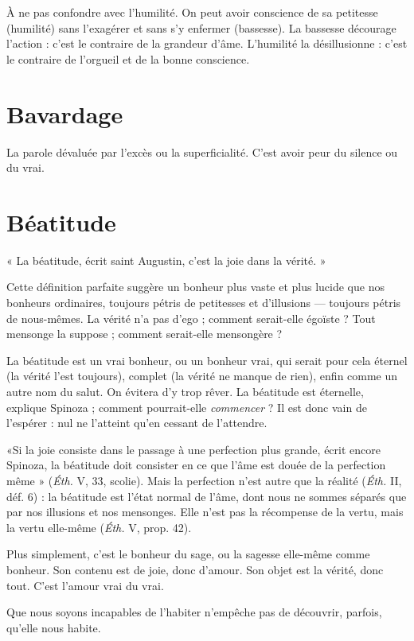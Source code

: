 À ne pas confondre avec l'humilité. On peut avoir conscience de sa petitesse
(humilité) sans l’exagérer et sans s’y enfermer (bassesse). La bassesse
décourage l’action : c’est le contraire de la grandeur d’âme. L’humilité la
désillusionne : c’est le contraire de l’orgueil et de la bonne conscience.

\section{Bavardage}
La parole dévaluée par l’excès ou la superficialité. C’est avoir
peur du silence ou du vrai.

\section{Béatitude}
« La béatitude, écrit saint Augustin, c’est la joie dans la vérité. »

Cette définition parfaite suggère un bonheur plus vaste et
plus lucide que nos bonheurs ordinaires, toujours pétris de petitesses et d’illusions —
toujours pétris de nous-mêmes. La vérité n’a pas d’ego ; comment
serait-elle égoïste ? Tout mensonge la suppose ; comment serait-elle mensongère ?

La béatitude est un vrai bonheur, ou un bonheur vrai, qui serait pour cela
éternel (la vérité l’est toujours), complet (la vérité ne manque de rien), enfin
comme un autre nom du salut. On évitera d’y trop rêver. La béatitude est éternelle,
explique Spinoza ; comment pourrait-elle {\it commencer} ? Il est donc vain de
l’espérer : nul ne l’atteint qu’en cessant de l’attendre.

«Si la joie consiste dans le passage à une perfection plus grande, écrit
encore Spinoza, la béatitude doit consister en ce que l’âme est douée de la perfection
même » ({\it Éth.} V, 33, scolie). Mais la perfection n’est autre que la réalité
({\it Éth.} II, déf. 6) : la béatitude est l’état normal de l’âme, dont nous ne sommes
séparés que par nos illusions et nos mensonges. Elle n’est pas la récompense de
la vertu, mais la vertu elle-même ({\it Éth.} V, prop. 42).

Plus simplement, c’est le bonheur du sage, ou la sagesse elle-même comme
bonheur. Son contenu est de joie, donc d’amour. Son objet est la vérité, donc
tout. C’est l’amour vrai du vrai.

Que nous soyons incapables de l’habiter n'empêche pas de découvrir, parfois,
qu’elle nous habite.

